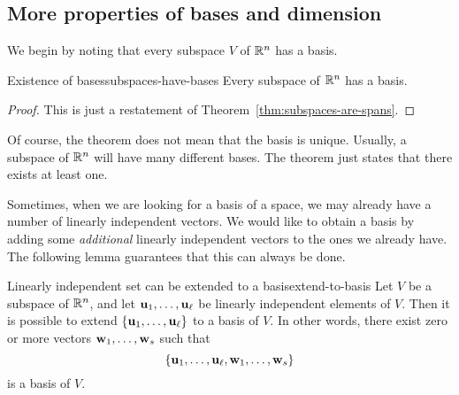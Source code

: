 \subsection{More properties of bases and dimension}

We begin by noting that every subspace $V$ of $\mathbb{R}^n$ has a basis.

\begin{theorem}{Existence of bases}{subspaces-have-bases}
  Every subspace of $\mathbb{R}^n$ has a basis.
\end{theorem}

\begin{proof}
  This is just a restatement of Theorem~\ref{thm:subspaces-are-spans}.
\end{proof}

Of course, the theorem does not mean that the basis is
unique. Usually, a subspace of $\mathbb{R}^n$ will have many different
bases. The theorem just states that there exists at least one.

Sometimes, when we are looking for a basis of a space, we may already
have a number of linearly independent vectors. We would like to obtain
a basis by adding some {\em additional} linearly independent vectors
to the ones we already have. The following lemma guarantees that this
can always be done.

\begin{lemma}{Linearly independent set can be extended to a basis}{extend-to-basis}
  Let $V$ be a subspace of $\mathbb{R}^n$, and let
  $\vect{u}_1,\ldots,\vect{u}_{\ell}$ be linearly independent elements
  of $V$. Then it is possible to extend
  $\set{\vect{u}_1,\ldots,\vect{u}_{\ell}}$ to a basis of $V$. In other
  words, there exist zero or more vectors
  $\vect{w}_1,\ldots,\vect{w}_s$ such that
  \begin{equation*}
    \set{\vect{u}_1,\ldots,\vect{u}_{\ell},\vect{w}_1,\ldots,\vect{w}_s}
  \end{equation*}
  is a basis of $V$.
\end{lemma}

